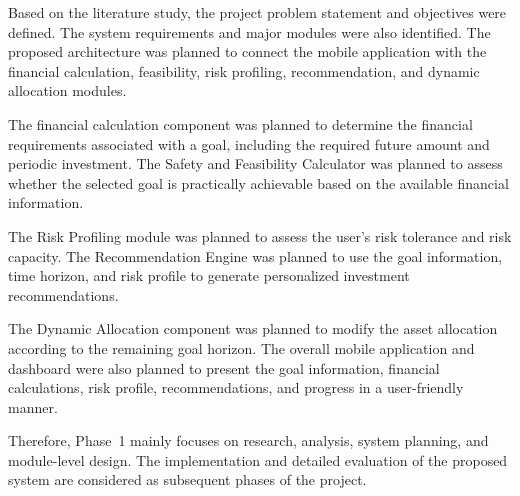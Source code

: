 Based on the literature study, the project problem statement and objectives were defined. The system requirements and major modules were also identified. The proposed architecture was planned to connect the mobile application with the financial calculation, feasibility, risk profiling, recommendation, and dynamic allocation modules.

The financial calculation component was planned to determine the financial requirements associated with a goal, including the required future amount and periodic investment. The Safety and Feasibility Calculator was planned to assess whether the selected goal is practically achievable based on the available financial information.

The Risk Profiling module was planned to assess the user's risk tolerance and risk capacity. The Recommendation Engine was planned to use the goal information, time horizon, and risk profile to generate personalized investment recommendations.

The Dynamic Allocation component was planned to modify the asset allocation according to the remaining goal horizon. The overall mobile application and dashboard were also planned to present the goal information, financial calculations, risk profile, recommendations, and progress in a user-friendly manner.

Therefore, Phase~1 mainly focuses on research, analysis, system planning, and module-level design. The implementation and detailed evaluation of the proposed system are considered as subsequent phases of the project.
